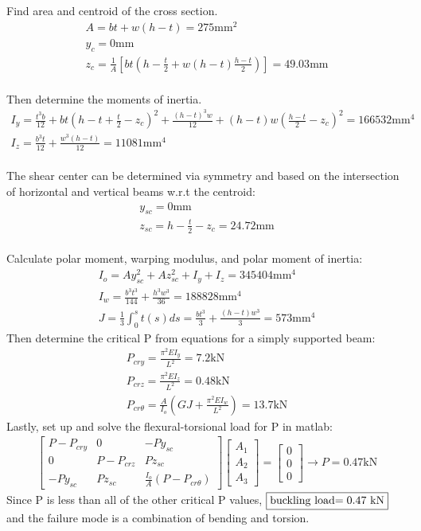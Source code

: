 \documentclass[12 pt]{article}
\begin{document}
\subsection*{}
Find area and centroid of the cross section.
\begin{align*}
    A=bt+w(h-t)=275\textrm{mm}^2 \\
    y_c=0\textrm{mm} \\
    z_c=\frac{1}{A}\left[bt(h-\frac{t}{2}+w(h-t)\frac{h-t}{2})\right]=49.03\textrm{mm}
\end{align*} \\
Then determine the moments of inertia.
\begin{align*}
    I_y=\frac{t^3b}{12}+bt(h-t+\frac{t}{2}-z_c)^2+\frac{(h-t)^3w}{12}+(h-t)w\left(\frac{h-t}{2}-z_c\right)^2=166532\textrm{mm}^4 \\
    I_z=\frac{b^3t}{12}+\frac{w^3(h-t)}{12}=11081\textrm{mm}^4
\end{align*} \\
The shear center can be determined via symmetry and based on the intersection of horizontal and vertical beams w.r.t the
centroid:
\begin{align*}
    y_{sc}=0\textrm{mm} \\
    z_{sc}=h-\frac{t}{2}-z_c=24.72\textrm{mm}
\end{align*} \\
Calculate polar moment, warping modulus, and polar moment of inertia:
\begin{align*}
    I_o=Ay_{sc}^2+Az_{sc}^2+I_y+I_z=345404\textrm{mm}^4 \\
    I_w=\frac{b^3t^3}{144}+\frac{h^3w^3}{36}=188828\textrm{mm}^4 \\
    J=\frac{1}{3}\int_0^st(s)ds=\frac{bt^3}{3}+\frac{(h-t)w^3}{3}=573\textrm{mm}^4
\end{align*}
Then determine the critical P from equations for a simply supported beam:
\begin{align*}
    P_{cry}=\frac{\pi^2EI_y}{L^2}=7.2\textrm{kN} \\
    P_{crz}=\frac{\pi^2EI_z}{L^2}=0.48\textrm{kN} \\
    P_{cr\theta}=\frac{A}{I_o}\left(GJ+\frac{\pi^2EI_w}{L^2}\right)=13.7\textrm{kN}
\end{align*}
Lastly, set up and solve the flexural-torsional load for P in matlab:
\begin{align*}
    \begin{bmatrix}
        P-P_{cry} & 0 & -Py_{sc} \\
        0 & P-P_{crz} & Pz_{sc} \\
        -Py_{sc} & Pz_{sc} & \frac{I_o}{A}(P-P_{cr\theta})
    \end{bmatrix}\begin{bmatrix}
        A_1 \\ A_2 \\ A_3
    \end{bmatrix}=\begin{bmatrix}
        0 \\ 0 \\ 0
    \end{bmatrix} \rightarrow P=0.47\textrm{kN}
\end{align*}
Since P is less than all of the other critical P values, $\fbox{buckling load$=0.47$ kN}$ and the failure mode is a
combination of bending and torsion.
\end{document}
